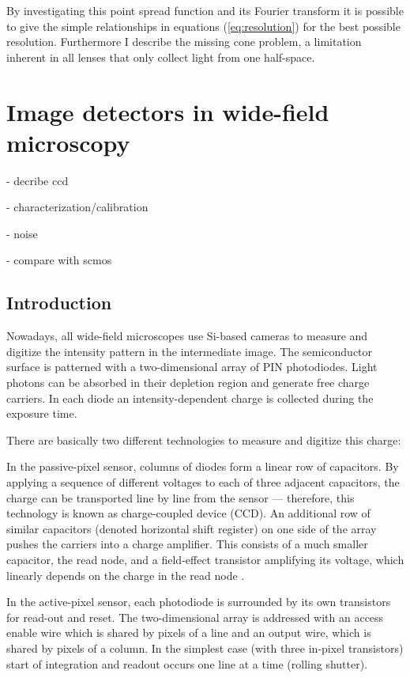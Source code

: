 By investigating this point spread function and its Fourier transform
it is possible to give the simple relationships in equations
(\ref{eq:resolution}) for the best possible resolution. Furthermore I
describe the missing cone problem, a limitation inherent in all lenses
that only collect light from one half-space.



\section{Image detectors in wide-field microscopy}
\label{sec:ccd-intro}
\begin{summary}
- decribe ccd

- characterization/calibration

- noise

- compare with scmos
\end{summary}

\subsection{Introduction}
Nowadays, all wide-field microscopes use Si-based cameras to measure   
and digitize the intensity pattern in the intermediate image. The
semiconductor surface is patterned with a two-dimensional array of PIN
photodiodes. Light photons can be absorbed in their depletion region
and generate free charge carriers. In each diode an
intensity-dependent charge is collected during the exposure time.

There are basically two different technologies to measure and digitize
this charge:

In the passive-pixel sensor, columns of diodes form a linear row of    
capacitors. By applying a sequence of different voltages to each of
three adjacent capacitors, the charge can be transported line by line
from the sensor --- therefore, this technology is known as
charge-coupled device (CCD). An additional row of similar capacitors
(denoted horizontal shift register) on one side of the array pushes
the carriers into a charge amplifier. This consists of a much smaller
capacitor, the read node, and a field-effect transistor amplifying its
voltage, which linearly depends on the charge in the read node
\citep{Pawley2006}. 

In the active-pixel sensor, each photodiode is surrounded by its own     
transistors for read-out and reset. The two-dimensional array is
addressed with an access enable wire which is shared by pixels of a
line and an output wire, which is shared by pixels of a column. In the
simplest case (with three in-pixel transistors) start of integration
and readout occurs one line at a time (rolling shutter).

